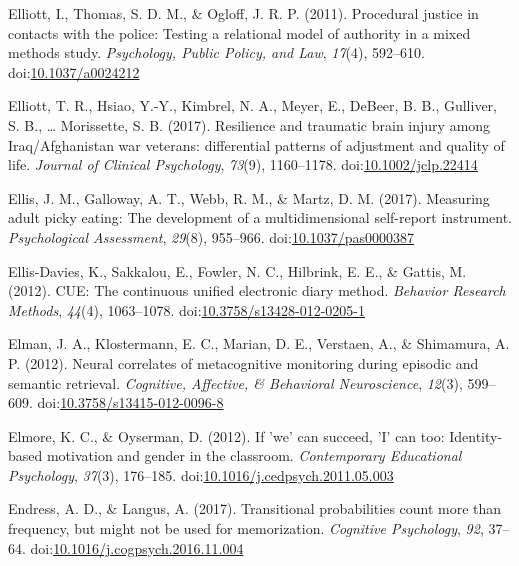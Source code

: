 \documentclass[english,man]{apa6}
\theoremstyle{definition}
\theoremstyle{definition}
\theoremstyle{definition}
\theoremstyle{remark}
\begin{document}
\hypertarget{ref-Elliott2011}{}
Elliott, I., Thomas, S. D. M., \& Ogloff, J. R. P. (2011). Procedural
justice in contacts with the police: Testing a relational model of
authority in a mixed methods study. \emph{Psychology, Public Policy, and
Law}, \emph{17}(4), 592--610.
doi:\href{https://doi.org/10.1037/a0024212}{10.1037/a0024212}

\hypertarget{ref-Elliott2017}{}
Elliott, T. R., Hsiao, Y.-Y., Kimbrel, N. A., Meyer, E., DeBeer, B. B.,
Gulliver, S. B., \ldots{} Morissette, S. B. (2017). Resilience and
traumatic brain injury among Iraq/Afghanistan war veterans: differential
patterns of adjustment and quality of life. \emph{Journal of Clinical
Psychology}, \emph{73}(9), 1160--1178.
doi:\href{https://doi.org/10.1002/jclp.22414}{10.1002/jclp.22414}

\hypertarget{ref-Ellis2017}{}
Ellis, J. M., Galloway, A. T., Webb, R. M., \& Martz, D. M. (2017).
Measuring adult picky eating: The development of a multidimensional
self-report instrument. \emph{Psychological Assessment}, \emph{29}(8),
955--966.
doi:\href{https://doi.org/10.1037/pas0000387}{10.1037/pas0000387}

\hypertarget{ref-Ellis-Davies2012}{}
Ellis-Davies, K., Sakkalou, E., Fowler, N. C., Hilbrink, E. E., \&
Gattis, M. (2012). CUE: The continuous unified electronic diary method.
\emph{Behavior Research Methods}, \emph{44}(4), 1063--1078.
doi:\href{https://doi.org/10.3758/s13428-012-0205-1}{10.3758/s13428-012-0205-1}

\hypertarget{ref-Elman2012}{}
Elman, J. A., Klostermann, E. C., Marian, D. E., Verstaen, A., \&
Shimamura, A. P. (2012). Neural correlates of metacognitive monitoring
during episodic and semantic retrieval. \emph{Cognitive, Affective, \&
Behavioral Neuroscience}, \emph{12}(3), 599--609.
doi:\href{https://doi.org/10.3758/s13415-012-0096-8}{10.3758/s13415-012-0096-8}

\hypertarget{ref-Elmore2012}{}
Elmore, K. C., \& Oyserman, D. (2012). If 'we' can succeed, 'I' can too:
Identity-based motivation and gender in the classroom.
\emph{Contemporary Educational Psychology}, \emph{37}(3), 176--185.
doi:\href{https://doi.org/10.1016/j.cedpsych.2011.05.003}{10.1016/j.cedpsych.2011.05.003}

\hypertarget{ref-Endress2017}{}
Endress, A. D., \& Langus, A. (2017). Transitional probabilities count
more than frequency, but might not be used for memorization.
\emph{Cognitive Psychology}, \emph{92}, 37--64.
doi:\href{https://doi.org/10.1016/j.cogpsych.2016.11.004}{10.1016/j.cogpsych.2016.11.004}
\end{document}
